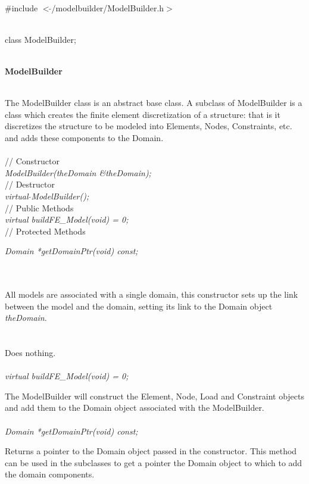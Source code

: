 
   \\
\#include $<\tilde{ }$/modelbuilder/ModelBuilder.h$>$  


  \\
class ModelBuilder;  


 \\
{\bf ModelBuilder} 


 \\ 
\indent The ModelBuilder class is an abstract base class. A subclass
of ModelBuilder is a class which creates the finite element
discretization of a structure: that is it discretizes the structure to
be modeled into Elements, Nodes, Constraints, etc. and adds these
components to the Domain.  \\

 \\
\indent // Constructor \\ 
{\em ModelBuilder(theDomain \&theDomain);}\\ 

\indent // Destructor \\ 
{\em virtual $\tilde{ }$ModelBuilder();}\\  

\indent // Public Methods \\ 
{\em virtual buildFE\_Model(void) = 0;} \\ 

// Protected Methods 

{\em  Domain *getDomainPtr(void) const;} 


 \\ 
\\ 
All models are associated with a single domain, this constructor
sets up the link between the model and the domain, setting its link
to the Domain object {\em theDomain}. \\

 \\
\\ 
Does nothing. \\

 \\
{\em virtual buildFE\_Model(void) = 0;} 

The ModelBuilder will construct the Element, Node, Load and Constraint
objects and add them to the Domain object associated with the ModelBuilder. \\

 \\
{\em  Domain *getDomainPtr(void) const;} 

Returns a pointer to the Domain object passed in the constructor. This
method can be used in the subclasses to get a pointer the Domain object
to which to add the domain components. \\


